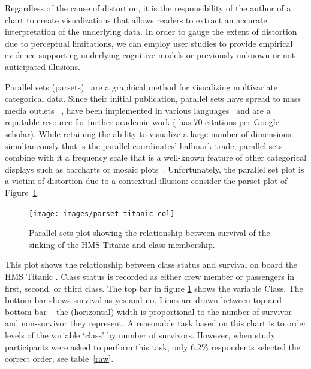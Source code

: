 \documentclass[journal]{vgtc}\usepackage{graphicx, color}
\begin{document}
Regardless of the cause of distortion, it is the responsibility of the  author of a chart to create visualizations that
 allows readers to extract an accurate interpretation of the underlying data.  In order to gauge the
extent of distortion due to perceptual limitations, we can employ user studies   to provide empirical evidence supporting 
underlying cognitive models or previously unknown or not anticipated illusions.




Parallel sets (parsets)~\citep{kosara:2006} are a graphical method  for visualizing multivariate categorical data. Since their initial publication, parallel sets have spread to mass media outlets ~\citep{eagereyes, bostock:2012, bbc:2009}, have been implemented in various languages~\citep{eagereyes, d3, davies} and are a reputable resource for further academic work (\citep{kosara:2006} has 70 citations per Google scholar). While retaining the %
ability to visualize a large number of dimensions simultaneously that is the parallel coordinates' hallmark trade, parallel sets combine with it a frequency scale that is a well-known feature of other categorical displays such as barcharts or mosaic plots~\citep{hartigan:1981, friendly:1992, hofmann:2000, theus:1997}.
Unfortunately, the parallel set plot is a victim of distortion due to a contextual illusion: consider the parset plot of Figure~\ref{question1a}.
%


%
%
\begin{figure}[hbtp]
\centering


{\centering \texttt{[image: images/parset-titanic-col]} 

}




\caption{\label{question1a} Parallel sets plot showing the relationship between survival of the sinking of the HMS Titanic and class membership. }
\end{figure}
%
This plot shows the relationship between class status and survival on board the HMS Titanic  \citep{dawson:1995}. Class status is recorded as either crew member or passengers in  first, second, or third class.  The top bar in figure \ref{question1a} shows the  variable Class. The bottom bar shows survival  as yes and no.
 Lines are drawn between top and bottom bar -- the  (horizontal) width is proportional to the number of survivor and non-survivor they represent. 
 A reasonable task based on this chart is to order levels of the variable `class' by number of survivors. However, when study participants were asked to perform this task, only $6.2\%$ respondents 
selected the correct order, see table~\ref{raw}.
\end{document}
